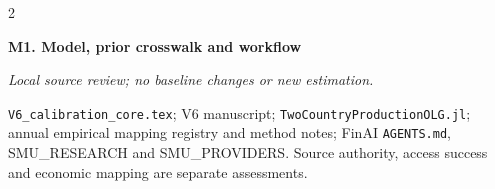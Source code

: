 \documentclass[10pt,a4paper,landscape]{article}
\newcommand{\code}[1]{{\footnotesize\texttt{#1}}}
\begin{document}
\begin{multicols}{2}
\begin{minipage}{\linewidth}
\end{minipage}\par\vspace{6pt}

\noindent\begin{minipage}{\linewidth}\raggedright

\hypertarget{src-M1}{\textbf{M1. Model, prior crosswalk and workflow}}\par

{\footnotesize\itshape Local source review; no baseline changes or new estimation.}\par

\code{V6\_calibration\_core.tex}; V6 manuscript; \code{TwoCountryProductionOLG.jl}; annual empirical mapping registry and method notes; FinAI \code{AGENTS.md}, SMU\_RESEARCH and SMU\_PROVIDERS. Source authority, access success and economic mapping are separate assessments.

\end{minipage}\par\vspace{6pt}

\end{multicols}
\end{document}

